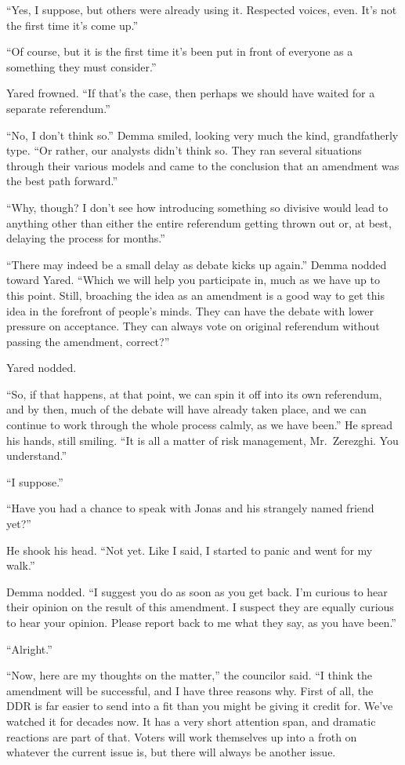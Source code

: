 ``Yes, I suppose, but others were already using it. Respected voices, even. It's not the first time it's come up.''

``Of course, but it is the first time it's been put in front of everyone as a something they must consider.''

Yared frowned. ``If that's the case, then perhaps we should have waited for a separate referendum.''

``No, I don't think so.'' Demma smiled, looking very much the kind, grandfatherly type. ``Or rather, our analysts didn't think so. They ran several situations through their various models and came to the conclusion that an amendment was the best path forward.''

``Why, though? I don't see how introducing something so divisive would lead to anything other than either the entire referendum getting thrown out or, at best, delaying the process for months.''

``There may indeed be a small delay as debate kicks up again.'' Demma nodded toward Yared. ``Which we will help you participate in, much as we have up to this point. Still, broaching the idea as an amendment is a good way to get this idea in the forefront of people's minds. They can have the debate with lower pressure on acceptance. They can always vote on original referendum without passing the amendment, correct?''

Yared nodded.

``So, if that happens, at that point, we can spin it off into its own referendum, and by then, much of the debate will have already taken place, and we can continue to work through the whole process calmly, as we have been.'' He spread his hands, still smiling. ``It is all a matter of risk management, Mr.~Zerezghi. You understand.''

``I suppose.''

``Have you had a chance to speak with Jonas and his strangely named friend yet?''

He shook his head. ``Not yet. Like I said, I started to panic and went for my walk.''

Demma nodded. ``I suggest you do as soon as you get back. I'm curious to hear their opinion on the result of this amendment. I suspect they are equally curious to hear your opinion. Please report back to me what they say, as you have been.''

``Alright.''

``Now, here are my thoughts on the matter,'' the councilor said. ``I think the amendment will be successful, and I have three reasons why. First of all, the DDR is far easier to send into a fit than you might be giving it credit for. We've watched it for decades now. It has a very short attention span, and dramatic reactions are part of that. Voters will work themselves up into a froth on whatever the current issue is, but there will always be another issue.

